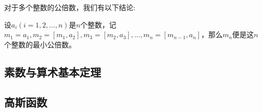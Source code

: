 对于多个整数的公倍数，我们有以下结论:
\begin{theorem}
  设$a_i(i=1,2,\ldots,n)$是$n$个整数，记$m_1=a_1, m_2=[m_1,a_2], m_3=[m_2,a_3],\ldots,m_n=[m_{n-1},a_n]$，那么$m_n$便是这$n$个整数的最小公倍数。
\end{theorem}

\subsection{素数与算术基本定理}
\label{sec:prime-number-and-fundamental-theorem-of-arithmetic}

\subsection{高斯函数}
\label{sec:gauss-function}


